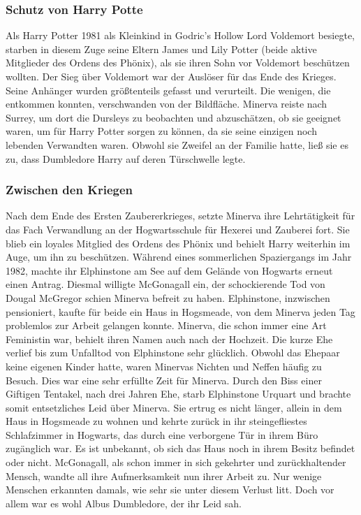\documentclass[a4paper, 10pt]{article}
\begin{document}
\subsubsection*{\large Schutz von Harry Potte}
Als Harry Potter 1981 als Kleinkind in Godric's Hollow Lord Voldemort besiegte, starben in diesem Zuge seine Eltern James und Lily Potter (beide aktive Mitglieder des Ordens des Phönix), als sie ihren Sohn vor Voldemort beschützen wollten. Der Sieg über Voldemort war der Auslöser für das Ende des Krieges. Seine Anhänger wurden größtenteils gefasst und verurteilt. Die wenigen, die entkommen konnten, verschwanden von der Bildfläche. Minerva reiste nach Surrey, um dort die Dursleys  zu beobachten und abzuschätzen, ob sie geeignet waren, um für Harry Potter sorgen zu können, da sie seine einzigen noch lebenden Verwandten waren. Obwohl sie Zweifel an der Familie hatte, ließ sie es zu, dass Dumbledore Harry auf deren Türschwelle legte.
\subsubsection*{\large Zwischen den Kriegen}
Nach dem Ende des Ersten Zaubererkrieges, setzte Minerva ihre Lehrtätigkeit für das Fach Verwandlung an der Hogwartsschule für Hexerei und Zauberei fort. Sie blieb ein loyales Mitglied des Ordens des Phönix und behielt Harry weiterhin im Auge, um ihn zu beschützen.
\vspace{10pt}
\newline
Während eines sommerlichen Spaziergangs im Jahr 1982, machte ihr Elphinstone am See auf dem Gelände von Hogwarts erneut einen Antrag. Diesmal willigte McGonagall ein, der schockierende Tod von Dougal McGregor schien Minerva befreit zu haben. Elphinstone, inzwischen pensioniert, kaufte für beide ein Haus in Hogsmeade, von dem Minerva jeden Tag problemlos zur Arbeit gelangen konnte. Minerva, die schon immer eine Art Feministin war, behielt ihren Namen auch nach der Hochzeit. Die kurze Ehe verlief bis zum Unfalltod von Elphinstone sehr glücklich. Obwohl das Ehepaar keine eigenen Kinder hatte, waren Minervas Nichten und Neffen häufig zu Besuch. Dies war eine sehr erfüllte Zeit für Minerva.
\vspace{10pt}
\newline
Durch den Biss einer Giftigen Tentakel, nach drei Jahren Ehe, starb Elphinstone Urquart und brachte somit entsetzliches Leid 
über Minerva. Sie ertrug es nicht länger, allein in dem Haus in Hogsmeade zu wohnen und kehrte zurück in ihr steingefliestes Schlafzimmer in Hogwarts, das durch eine verborgene Tür in ihrem Büro zugänglich war. Es ist unbekannt, ob sich das Haus noch in ihrem Besitz befindet oder nicht. McGonagall, als schon immer in sich gekehrter und zurückhaltender Mensch, wandte all ihre Aufmerksamkeit nun ihrer Arbeit zu. Nur wenige Menschen erkannten damals, wie sehr sie unter diesem Verlust litt. Doch vor allem war es wohl Albus Dumbledore, der ihr Leid sah.
\end{document}
